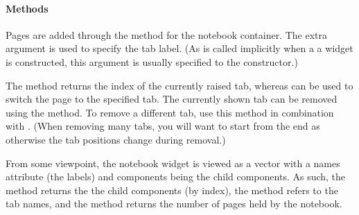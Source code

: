 \paragraph{Methods}
Pages are added through the  method for the
notebook container. The extra   argument is used
to specify the tab label. (As  is called implicitly when a a
widget is constructed, this argument is usually specified to the
constructor.)



The  method returns the index of the
currently raised tab, whereas  can be
used to switch the page to the specified tab. The currently shown tab
can be removed using the  method. To remove
a different tab, use this method in combination with
. (When removing many tabs, you will want to start
from the end as otherwise the tab positions change during removal.)

From some viewpoint, the notebook widget is viewed as a vector with a
names attribute (the labels) and components being the child
components. As such, the \meth{[} method returns the the child
components (by index), the  method refers to
the tab names, and the  method returns the
number of pages held by the notebook.



